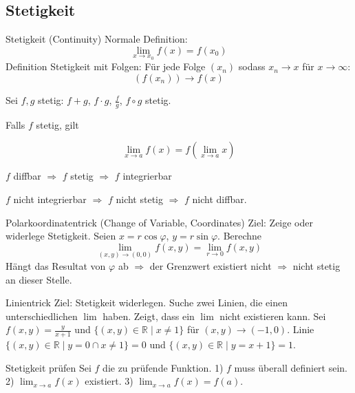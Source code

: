 
\subsection{Stetigkeit}

\begin{Definition}{Stetigkeit (Continuity)}{}
    Normale Definition:
    \[
    \lim_{x\rightarrow x_0} f(x) = f(x_0)
    \]
    Definition Stetigkeit mit Folgen: Für jede Folge $(x_n)$ sodass $x_n \rightarrow x$ für $x\rightarrow \infty $:
    \[
    (f(x_n)) \rightarrow f(x)
    \]
\end{Definition}

Sei $f,g$ stetig: $f+g$, $f\cdot g$, $\frac{f}{g}$, $f \circ g$ stetig.

Falls $f$ stetig, gilt

\[
    \lim_{x \rightarrow a} f(x) = f(\lim_{x\rightarrow a} x)
\]

$f$ diffbar $\Rightarrow$ $f$ stetig $\Rightarrow$ $f$ integrierbar

$f$ nicht integrierbar $\Rightarrow$ $f$ nicht stetig $\Rightarrow$ $f$ nicht diffbar.\\

\begin{Rezept}{Polarkoordinatentrick (Change of Variable, Coordinates)}{}
    Ziel: Zeige oder widerlege Stetigkeit. Seien $x=r\cos \varphi$, $y=r\sin \varphi$. Berechne
    \[
    \lim_{(x, y) \rightarrow (0,0)} f(x, y) = \lim_{r \rightarrow 0} f(x, y)
    \]
    Hängt das Resultat von $\varphi$ ab $\Rightarrow$ der Grenzwert existiert nicht $\Rightarrow$ nicht stetig an dieser Stelle.
\end{Rezept}

\begin{Rezept}{Linientrick}{}
    Ziel: Stetigkeit widerlegen. Suche zwei Linien, die einen unterschiedlichen $\lim$ haben. Zeigt, dass ein $\lim$ nicht existieren kann.
    Sei $f(x, y)=\frac{y}{x+1}$ und $\{(x, y) \in \mathbb{R} \mid x \neq 1\}$ für $(x, y) \rightarrow (-1, 0)$. Linie $\{(x, y) \in \mathbb{R} \mid y=0\cap x \neq 1\}=0$ und $\{(x, y) \in \mathbb{R} \mid y=x+1\}=1$.
\end{Rezept}

\begin{Rezept}{Stetigkeit prüfen}{}
    Sei $f$ die zu prüfende Funktion. 1) $f$ muss überall definiert sein. 2) $\lim_{x \rightarrow a} f(x)$ existiert. 3) $\lim_{x \rightarrow a} f(x) = f(a)$.
\end{Rezept}
